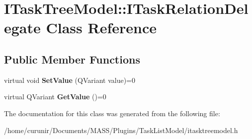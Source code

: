 \hypertarget{class_i_task_tree_model_1_1_i_task_relation_delegate}{}\section{I\+Task\+Tree\+Model\+:\+:I\+Task\+Relation\+Delegate Class Reference}
\label{class_i_task_tree_model_1_1_i_task_relation_delegate}
\subsection*{Public Member Functions}
\begin{DoxyCompactItemize}
\item 
virtual void {\bfseries Set\+Value} (Q\+Variant value)=0\hypertarget{class_i_task_tree_model_1_1_i_task_relation_delegate_ab13bf8d76da4ca5e9925a7af7827a994}{}\label{class_i_task_tree_model_1_1_i_task_relation_delegate_ab13bf8d76da4ca5e9925a7af7827a994}

\item 
virtual Q\+Variant {\bfseries Get\+Value} ()=0\hypertarget{class_i_task_tree_model_1_1_i_task_relation_delegate_a1a720d6d7ca9a7aeaf9b182326152d17}{}\label{class_i_task_tree_model_1_1_i_task_relation_delegate_a1a720d6d7ca9a7aeaf9b182326152d17}

\end{DoxyCompactItemize}


The documentation for this class was generated from the following file\+:\begin{DoxyCompactItemize}
\item 
/home/curunir/\+Documents/\+M\+A\+S\+S/\+Plugins/\+Task\+List\+Model/itasktreemodel.\+h\end{DoxyCompactItemize}
